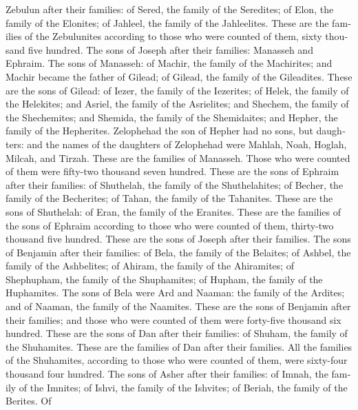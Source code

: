 \begin{paracol}{2}
\begin{otherlanguage}{english}
Zebulun after their families: of Sered, the family of the Seredites; of
Elon, the family of the Elonites; of Jahleel, the family of the
Jahleelites.  These are the families of the Zebulunites
according to those who were counted of them, sixty thousand five
hundred.  The sons of Joseph after their families:
Manasseh and Ephraim.  The sons of Manasseh: of Machir,
the family of the Machirites; and Machir became the father of Gilead; of
Gilead, the family of the Gileadites.  These are the sons
of Gilead: of Iezer, the family of the Iezerites; of Helek, the family
of the Helekites;  and Asriel, the family of the
Asrielites; and Shechem, the family of the Shechemites; 
and Shemida, the family of the Shemidaites; and Hepher, the family of
the Hepherites.  Zelophehad the son of Hepher had no
sons, but daughters: and the names of the daughters of Zelophehad were
Mahlah, Noah, Hoglah, Milcah, and Tirzah.  These are the
families of Manasseh. Those who were counted of them were fifty-two
thousand seven hundred.  These are the sons of Ephraim
after their families: of Shuthelah, the family of the Shuthelahites; of
Becher, the family of the Becherites; of Tahan, the family of the
Tahanites.  These are the sons of Shuthelah: of Eran, the
family of the Eranites.  These are the families of the
sons of Ephraim according to those who were counted of them, thirty-two
thousand five hundred. These are the sons of Joseph after their
families.  The sons of Benjamin after their families: of
Bela, the family of the Belaites; of Ashbel, the family of the
Ashbelites; of Ahiram, the family of the Ahiramites;  of
Shephupham, the family of the Shuphamites; of Hupham, the family of the
Huphamites.  The sons of Bela were Ard and Naaman: the
family of the Ardites; and of Naaman, the family of the Naamites.
 These are the sons of Benjamin after their families; and
those who were counted of them were forty-five thousand six hundred.
 These are the sons of Dan after their families: of
Shuham, the family of the Shuhamites. These are the families of Dan
after their families.  All the families of the
Shuhamites, according to those who were counted of them, were sixty-four
thousand four hundred.  The sons of Asher after their
families: of Imnah, the family of the Imnites; of Ishvi, the family of
the Ishvites; of Beriah, the family of the Berites.  Of

\end{otherlanguage}
\end{paracol}
